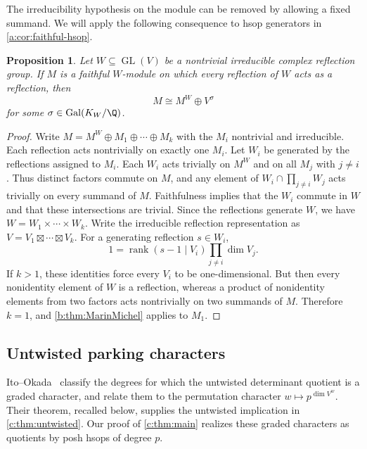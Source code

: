 \documentclass[11pt]{amsart}
\newtheorem{proposition}[theorem]{Proposition}
\theoremstyle{definition}
\begin{document}
The irreducibility hypothesis on the module can be removed by allowing
a fixed summand. We will apply the following consequence to hsop
generators in \cref{a:cor:faithful-hsop}.

\begin{proposition}\label{a:prop:faithful-reflection-module}
Let $W\subseteq\operatorname{GL}(V)$ be a nontrivial irreducible complex
reflection group. If $M$ is a faithful $W$-module on which every
reflection of $W$ acts as a reflection, then
\[
 M\cong M^W\oplus V^\sigma
\]
for some $\sigma\in\operatorname{Gal}(K_W/\Q)$.
\end{proposition}
\begin{proof}
Write $M=M^W\oplus M_1\oplus\cdots\oplus M_k$ with the $M_i$
nontrivial and irreducible. Each reflection acts nontrivially on exactly
one $M_i$. Let $W_i$ be generated by the reflections assigned to $M_i$.
Each $W_i$ acts trivially on $M^W$ and on all $M_j$ with $j\ne i$.
Thus distinct factors commute on $M$, and any element of
$W_i\cap\prod_{j\ne i}W_j$ acts trivially on every summand of $M$.
Faithfulness implies that the $W_i$ commute in $W$ and that these
intersections are trivial. Since the reflections generate $W$, we have
$W=W_1\times\cdots\times W_k$.
Write the irreducible reflection representation as
$V=V_1\boxtimes\cdots\boxtimes V_k$. For a generating reflection
$s\in W_i$,
\[
 1=\operatorname{rank}(s-1\mid V_i)\prod_{j\ne i}\dim V_j.
\]
If $k>1$, these identities force every $V_i$ to be one-dimensional.
But then every nonidentity element of $W$ is a reflection, whereas a
product of nonidentity elements from two factors acts nontrivially on
two summands of $M$. Therefore $k=1$, and \cref{b:thm:MarinMichel}
applies to $M_1$.
\end{proof}

\subsection{Untwisted parking characters}\label{b:sec:ito-okada}

Ito--Okada~\cite[Theorem~1.4]{IO} classify the degrees for which the
untwisted determinant quotient is a graded character, and relate them
to the permutation character $w\mapsto p^{\dim V^w}$.
Their theorem, recalled below, supplies the untwisted implication in
\cref{c:thm:untwisted}. Our proof of \cref{c:thm:main} realizes these
graded characters as quotients by posh hsops of degree $p$.
\end{document}
